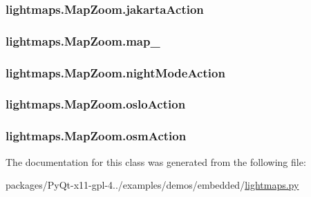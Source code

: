 \subsubsection[{jakarta\+Action}]{\setlength{\rightskip}{0pt plus 5cm}lightmaps.\+Map\+Zoom.\+jakarta\+Action}\label{classlightmaps_1_1MapZoom_acfbf75b53414ecb6a37687e89e79962a}
\hypertarget{classlightmaps_1_1MapZoom_a4a449303bff5c2277a2d685880a735f7}{}
\subsubsection[{map\+\_\+}]{\setlength{\rightskip}{0pt plus 5cm}lightmaps.\+Map\+Zoom.\+map\+\_\+}\label{classlightmaps_1_1MapZoom_a4a449303bff5c2277a2d685880a735f7}
\hypertarget{classlightmaps_1_1MapZoom_ae4c4a7598a0adf0dbf4f711cfd75df8d}{}
\subsubsection[{night\+Mode\+Action}]{\setlength{\rightskip}{0pt plus 5cm}lightmaps.\+Map\+Zoom.\+night\+Mode\+Action}\label{classlightmaps_1_1MapZoom_ae4c4a7598a0adf0dbf4f711cfd75df8d}
\hypertarget{classlightmaps_1_1MapZoom_ae838c03d76d435964179e4a0e67d9fef}{}
\subsubsection[{oslo\+Action}]{\setlength{\rightskip}{0pt plus 5cm}lightmaps.\+Map\+Zoom.\+oslo\+Action}\label{classlightmaps_1_1MapZoom_ae838c03d76d435964179e4a0e67d9fef}
\hypertarget{classlightmaps_1_1MapZoom_a9d5eddaa6e5c03d6d3c425a27955b9cd}{}
\subsubsection[{osm\+Action}]{\setlength{\rightskip}{0pt plus 5cm}lightmaps.\+Map\+Zoom.\+osm\+Action}\label{classlightmaps_1_1MapZoom_a9d5eddaa6e5c03d6d3c425a27955b9cd}


The documentation for this class was generated from the following file\+:\begin{DoxyCompactItemize}
\item 
packages/\+Py\+Qt-\/x11-\/gpl-\/4../examples/demos/embedded/\hyperlink{lightmaps_8py}{lightmaps.\+py}\end{DoxyCompactItemize}
